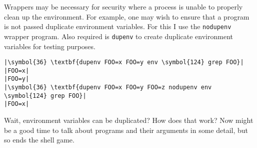 \documentclass[10pt,a4paper]{article}
\begin{document}
Wrappers may be necessary for security where a process is unable to
properly clean up the environment. For example, one may wish to
ensure that a program is not passed duplicate environment variables.
For this I use the \texttt{nodupenv} wrapper program. Also required
is \texttt{dupenv} to create duplicate environment variables for
testing purposes.

\begin{lstlisting}
|\symbol{36} \textbf{dupenv FOO=x FOO=y env \symbol{124} grep FOO}|
|FOO=x|
|FOO=y|
|\symbol{36} \textbf{dupenv FOO=x FOO=y FOO=z nodupenv env \symbol{124} grep FOO}|
|FOO=x|
\end{lstlisting}

Wait, environment variables can be duplicated? How does that work? Now
might be a good time to talk about programs and their arguments in some
detail, but so ends the shell game.


\end{document}
